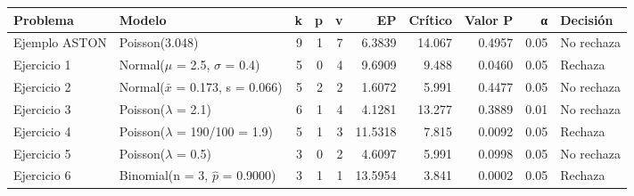 \begin{tabular}{llrrrrrrrl}
\toprule
\textbf{Problema} & \textbf{Modelo} & \textbf{k} & \textbf{p} & \textbf{v} & \textbf{EP} & \textbf{Crítico} & \textbf{Valor P} & \textbf{α} & \textbf{Decisión} \\ \midrule
Ejemplo ASTON & Poisson(3.048) & 9 & 1 & 7 & 6.3839 & 14.067 & 0.4957 & 0.05 & No rechaza \\
Ejercicio 1 & Normal($\mu$ = 2.5, $\sigma$ = 0.4) & 5 & 0 & 4 & 9.6909 & 9.488 & 0.0460 & 0.05 & Rechaza \\
Ejercicio 2 & Normal($\bar x$ = 0.173, s = 0.066) & 5 & 2 & 2 & 1.6072 & 5.991 & 0.4477 & 0.05 & No rechaza \\
Ejercicio 3 & Poisson($\lambda$ = 2.1) & 6 & 1 & 4 & 4.1281 & 13.277 & 0.3889 & 0.01 & No rechaza \\
Ejercicio 4 & Poisson($\lambda$ = 190/100 = 1.9) & 5 & 1 & 3 & 11.5318 & 7.815 & 0.0092 & 0.05 & Rechaza \\
Ejercicio 5 & Poisson($\lambda$ = 0.5) & 3 & 0 & 2 & 4.6097 & 5.991 & 0.0998 & 0.05 & No rechaza \\
Ejercicio 6 & Binomial(n = 3, $\hat p$ = 0.9000) & 3 & 1 & 1 & 13.5954 & 3.841 & 0.0002 & 0.05 & Rechaza \\
\bottomrule
\end{tabular}
